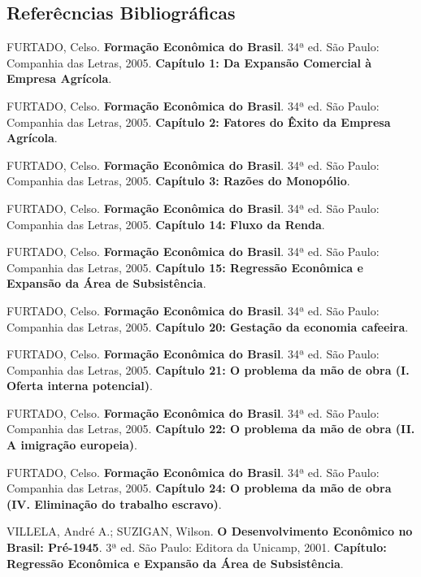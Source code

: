 \documentclass[a4paper,12pt]{article}[abntex2]
\begin{document}
\subsection{\textbf{Referêcncias Bibliográficas}}
\begin{thebibliography}{99}

FURTADO, Celso. \textbf{Formação Econômica do Brasil}. 34ª ed. São Paulo: Companhia das Letras, 2005.
\textbf{Capítulo 1: Da Expansão Comercial à Empresa Agrícola}.

FURTADO, Celso. \textbf{Formação Econômica do Brasil}. 34ª ed. São Paulo: Companhia das Letras, 2005.
\textbf{Capítulo 2: Fatores do Êxito da Empresa Agrícola}.

FURTADO, Celso. \textbf{Formação Econômica do Brasil}. 34ª ed. São Paulo: Companhia das Letras, 2005.
\textbf{Capítulo 3: Razões do Monopólio}.

FURTADO, Celso. \textbf{Formação Econômica do Brasil}. 34ª ed. São Paulo: Companhia das Letras, 2005.
\textbf{Capítulo 14: Fluxo da Renda}.

FURTADO, Celso. \textbf{Formação Econômica do Brasil}. 34ª ed. São Paulo: Companhia das Letras, 2005.
\textbf{Capítulo 15: Regressão Econômica e Expansão da Área de Subsistência}.

FURTADO, Celso. \textbf{Formação Econômica do Brasil}. 34ª ed. São Paulo: Companhia das Letras, 2005.
\textbf{Capítulo 20: Gestação da economia cafeeira}.

FURTADO, Celso. \textbf{Formação Econômica do Brasil}. 34ª ed. São Paulo: Companhia das Letras, 2005.
\textbf{Capítulo 21: O problema da mão de obra (I. Oferta interna potencial)}.

FURTADO, Celso. \textbf{Formação Econômica do Brasil}. 34ª ed. São Paulo: Companhia das Letras, 2005.
\textbf{Capítulo 22: O problema da mão de obra (II. A imigração europeia)}.

FURTADO, Celso. \textbf{Formação Econômica do Brasil}. 34ª ed. São Paulo: Companhia das Letras, 2005.
\textbf{Capítulo 24: O problema da mão de obra (IV. Eliminação do trabalho escravo)}.

VILLELA, André A.; SUZIGAN, Wilson. \textbf{O Desenvolvimento Econômico no Brasil: Pré-1945}. 3ª ed. São Paulo: Editora da Unicamp, 2001.
\textbf{Capítulo: Regressão Econômica e Expansão da Área de Subsistência}.


\end{thebibliography}
\end{document}
